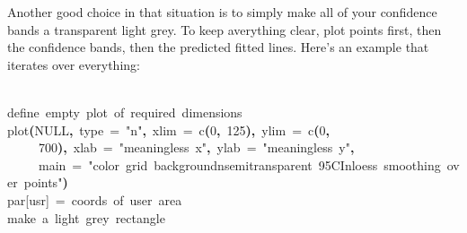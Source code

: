 \documentclass[a4paper]{article}
\newcommand{\hlnumber}[1]{\textcolor[rgb]{0.0823529411764706,0.0784313725490196,0.709803921568627}{#1}}%
\newcommand{\hlfunctioncall}[1]{\textcolor[rgb]{1,0,0}{#1}}%
\newcommand{\hlstring}[1]{\textcolor[rgb]{0.6,0.6,1}{#1}}%
\newcommand{\hlkeyword}[1]{\textcolor[rgb]{0,0,0}{\textbf{#1}}}%
\newcommand{\hlargument}[1]{\textcolor[rgb]{0.694117647058824,0.247058823529412,0.0196078431372549}{#1}}%
\newcommand{\hlcomment}[1]{\textcolor[rgb]{0.8,0.8,0.8}{#1}}%
\newcommand{\hlprompt}[1]{\textcolor[rgb]{0,0,0}{#1}}%
\newcommand{\hlstd}[1]{\textcolor[rgb]{0,0,0}{#1}}%
\newenvironment{Houtput}{\raggedright}{%
%
}
\begin{document}
Another good choice in that situation is to simply make all of your confidence bands a transparent light grey. To keep averything clear, plot points first, then the confidence bands, then the predicted fitted lines. Here's an example that iterates over everything:

\begin{Houtput}
\hspace*{\fill}\\
\hlstd{}\ttfamily\noindent
\hlprompt{\usebox{\hlnormalsizeboxgreaterthan}{\ }}\hlcomment{\usebox{\hlnormalsizeboxhash}{\ }define{\ }empty{\ }plot{\ }of{\ }required{\ }dimensions}\mbox{}
\normalfont
\hspace*{\fill}\\
\hlstd{}\ttfamily\noindent
\hlprompt{\usebox{\hlnormalsizeboxgreaterthan}{\ }}\hlfunctioncall{plot}\hlkeyword{(}NULL\hlkeyword{,}{\ }\hlargument{type}{\ }\hlargument{=}{\ }\hlstring{"n"}\hlkeyword{,}{\ }\hlargument{xlim}{\ }\hlargument{=}{\ }\hlfunctioncall{c}\hlkeyword{(}\hlnumber{0}\hlkeyword{,}{\ }\hlnumber{125}\hlkeyword{)}\hlkeyword{,}{\ }\hlargument{ylim}{\ }\hlargument{=}{\ }\hlfunctioncall{c}\hlkeyword{(}\hlnumber{0}\hlkeyword{,}\hspace*{\fill}\\
\hlstd{}\hlprompt{{\ }}{\ }{\ }{\ }{\ }\hlnumber{700}\hlkeyword{)}\hlkeyword{,}{\ }\hlargument{xlab}{\ }\hlargument{=}{\ }\hlstring{"meaningless{\ }x"}\hlkeyword{,}{\ }\hlargument{ylab}{\ }\hlargument{=}{\ }\hlstring{"meaningless{\ }y"}\hlkeyword{,}\hspace*{\fill}\\
\hlstd{}\hlprompt{{\ }}{\ }{\ }{\ }{\ }\hlargument{main}{\ }\hlargument{=}{\ }\hlstring{"color{\ }grid{\ }background\usebox{\hlnormalsizeboxbackslash}nsemitransparent{\ }95\usebox{\hlnormalsizeboxpercent}{\ }CI\usebox{\hlnormalsizeboxbackslash}nloess{\ }smoothing{\ }over{\ }points"}\hlkeyword{)}\mbox{}
\normalfont
\hspace*{\fill}\\
\hlstd{}\ttfamily\noindent
\hlprompt{\usebox{\hlnormalsizeboxgreaterthan}{\ }}\hlcomment{\usebox{\hlnormalsizeboxhash}{\ }par[\usebox{\hlnormalsizeboxsinglequote}usr\usebox{\hlnormalsizeboxsinglequote}]{\ }={\ }coords{\ }of{\ }user{\ }area}\mbox{}
\normalfont
\hspace*{\fill}\\
\hlstd{}\ttfamily\noindent
\hlprompt{\usebox{\hlnormalsizeboxgreaterthan}{\ }}\hlcomment{\usebox{\hlnormalsizeboxhash}{\ }make{\ }a{\ }light{\ }grey{\ }rectangle}\mbox{}
\normalfont
\hspace*{\fill}\\

\end{Houtput}
\end{document}
